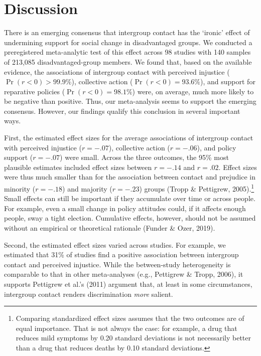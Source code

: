 \documentclass[12pt, letterpaper]{article}
\begin{document}
\hypertarget{discussion}{%
\section{Discussion}\label{discussion}}

There is an emerging consensus that intergroup contact has the `ironic'
effect of undermining support for social change in disadvantaged groups.
We conducted a preregistered meta-analytic test of this effect across 98
studies with 140 samples of 213,085 disadvantaged-group members. We
found that, based on the available evidence, the associations of
intergroup contact with perceived injustice (\(\Pr (r < 0) > 99.9\%\)),
collective action (\(\Pr (r < 0) = 93.6\%\)), and support for reparative
policies (\(\Pr (r < 0) = 98.1\%\)) were, on average, much more likely
to be negative than positive. Thus, our meta-analysis seems to support
the emerging consensus. However, our findings qualify this conclusion in
several important ways.

First, the estimated effect sizes for the average associations of
intergroup contact with perceived injustice (\(r = -.07\)), collective
action (\(r = -.06\)), and policy support (\(r = -.07\)) were small.
Across the three outcomes, the 95\% most plausible estimates included
effect sizes between \(r = -.14\) and \(r = .02\). Effect sizes were
thus much smaller than for the association between contact and prejudice
in minority (\(r = -.18\)) and majority (\(r = -.23\)) groups (Tropp \&
Pettigrew, 2005).\footnote{Comparing standardized effect sizes assumes
  that the two outcomes are of equal importance. That is not always the
  case: for example, a drug that reduces mild symptoms by 0.20 standard
  deviations is not necessarily better than a drug that reduces deaths
  by 0.10 standard deviations.} Small effects can still be important if
they accumulate over time or across people. For example, even a small
change in policy attitudes could, if it affects enough people, sway a
tight election. Cumulative effects, however, should not be assumed
without an empirical or theoretical rationale (Funder \& Ozer, 2019).

Second, the estimated effect sizes varied across studies. For example,
we estimated that 31\% of studies find a positive association between
intergroup contact and perceived injustice. While the between-study
heterogeneity is comparable to that in other meta-analyses (e.g.,
Pettigrew \& Tropp, 2006), it supports Pettigrew et al.'s (2011)
argument that, at least in some circumstances, intergroup contact
renders discrimination \emph{more} salient.
\end{document}
